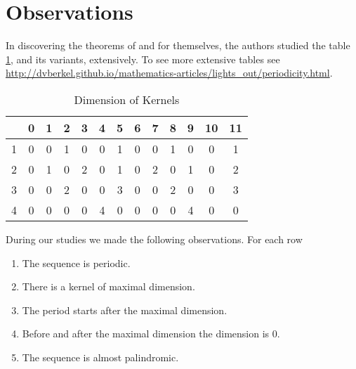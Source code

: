 \section{Observations}
In discovering the theorems of \cite{martin01} and \cite{leach17} for
themselves, the authors studied the table \ref{kernels}, and its variants,
extensively. To see more extensive tables see \url{http://dvberkel.github.io/mathematics-articles/lights_out/periodicity.html}.

\begin{table}
  \begin{center}
  \begin{tabular}{|c|cccccccccccc|}
    \hline
    & \phantom{0}0 & \phantom{0}1 & \phantom{0}2 & \phantom{0}3 & \phantom{0}4 & \phantom{0}5 & \phantom{0}6 & \phantom{0}7 & \phantom{0}8 & \phantom{0}9 & 10 & 11 \\
    \hline
    \hline
    1 & 0 & 0 & 1 & 0 & 0 & 1 & 0 & 0 & 1 & 0 & 0 & 1 \\
    2 & 0 & 1 & 0 & 2 & 0 & 1 & 0 & 2 & 0 & 1 & 0 & 2 \\
    3 & 0 & 0 & 2 & 0 & 0 & 3 & 0 & 0 & 2 & 0 & 0 & 3 \\
    4 & 0 & 0 & 0 & 0 & 4 & 0 & 0 & 0 & 0 & 4 & 0 & 0 \\
    \hline
  \end{tabular}
  \end{center}
  \caption{Dimension of Kernels}\label{kernels}
\end{table}

During our studies we made the following observations. For each row

\begin{enumerate}
\item \label{observation.periodic} The sequence is periodic.
\item \label{observation.maximal} There is a kernel of maximal dimension.
\item \label{observation.period} The period starts after the maximal dimension.
\item \label{observation.surround} Before and after the maximal dimension
  the dimension is $0$.
\item \label{observation.palindromic} The sequence is almost palindromic.
\end{enumerate}
